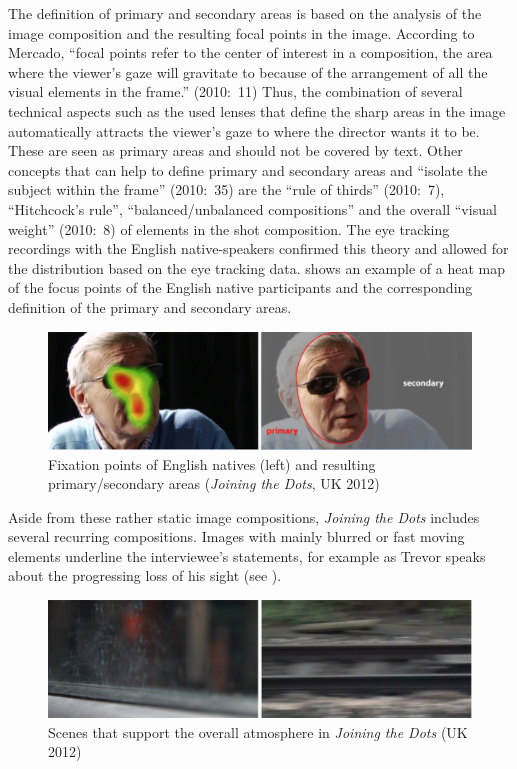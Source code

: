 \documentclass[output=paper]{langsci/langscibook}
\begin{document}
The definition of primary and secondary areas is based on the analysis of the image composition and the resulting focal points in the image. According to Mercado, ``focal points refer to the center of interest in a composition, the area where the viewer's gaze will gravitate to because of the arrangement of all the visual elements in the frame.'' (2010:~11) Thus, the combination of several technical aspects such as the used lenses that define the sharp areas in the image automatically attracts the viewer's gaze to where the director wants it to be. These are seen as primary areas and should not be covered by text. Other concepts that can help to define primary and secondary areas and ``isolate the subject within the frame'' (2010:~35) are the ``rule of thirds'' (2010:~7), ``Hitchcock's rule'', ``balanced/unbalanced compositions'' and the overall ``visual weight'' (2010:~8) of elements in the shot composition. The eye tracking recordings with the English native-speakers confirmed this theory and allowed for the distribution based on the eye tracking data.  shows an example of a heat map of the focus points of the English native participants and the corresponding definition of the primary and secondary areas.

\begin{figure}
 \includegraphics[width=\textwidth]{figures/Fox3.png}
 \caption{Fixation points of English natives (left) and resulting primary/secondary areas (\textit{Joining the Dots}, UK 2012)}
 \label{fox:fig:3}
\end{figure}  



Aside from these rather static image compositions, \textit{Joining the Dots} includes several recurring compositions. Images with mainly blurred or fast moving elements underline the interviewee's statements, for example as Trevor speaks about the progressing loss of his sight (see ).


\begin{figure}
 \includegraphics[width=\textwidth]{figures/Fox4.png}
 \caption{Scenes that support the overall atmosphere in \textit{Joining the Dots} (UK 2012)}
 \label{fox:fig:4}
\end{figure} 
\end{document}
